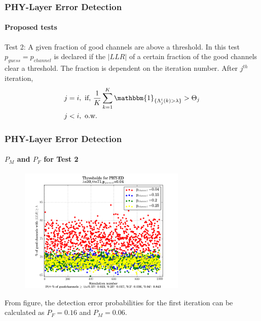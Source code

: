 \documentclass[xcolor=dvipsnames]{beamer}
\begin{document}
\begin{frame}[label=test2]
\frametitle{PHY-Layer Error Detection}
\framesubtitle{Proposed tests}
\begin{block}{Test 2: A given fraction of good channels are above a threshold.}
In this test $p_{guess}=p_{channel}$ is declared if the $|LLR|$ of a certain fraction of the good channels clear a threshold. The fraction is dependent on the iteration number. After $j^{th}$ iteration,
\begin{align*}  
j &=i,
 \text{   if, } \frac{1}{K}\sum^K_{k=1} \mathbbm{1}_{\{\Lambda_{j}^i(k) > \lambda\}} > \Theta_j \\
j & < i,  \text{ o.w. }
\end{align*} 
\end{block}
\end{frame}
\begin{frame}[label=theta1]
\frametitle{PHY-Layer Error Detection}
\framesubtitle{$P_M$ and $P_F$ for Test 2}
\begin{figure}[h]
 \begin{center}
    \includegraphics[width=8cm]{theta0p04.png}
  \end{center}
  \label{fig:iswrpc}
\end{figure}
From figure, the detection error probabilities for the first  iteration can be calculated as $P_F=0.16$ and $P_M=0.06$.
\end{frame}
\end{document}

